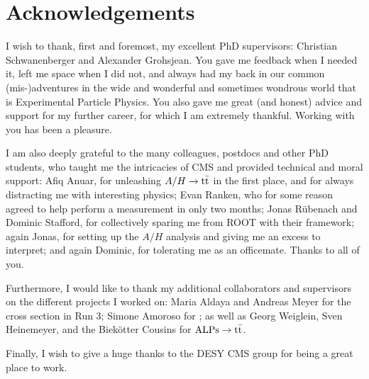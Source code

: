 \chapter{Acknowledgements}

I wish to thank, first and foremost, my excellent PhD supervisors: Christian Schwanenberger and Alexander Grohsjean. You gave me feedback when I needed it, left me space when I did not, and always had my back in our common (mis-)adventures in the wide and wonderful and sometimes wondrous world that is Experimental Particle Physics. You also gave me great (and honest) advice and support for my further career, for which I am extremely thankful. Working with you has been a pleasure.

I am also deeply grateful to the many colleagues, postdocs and other PhD students, who taught me the intricacies of CMS and provided technical and moral support: Afiq Anuar, for unleashing $A/H \rightarrow \mathrm{t \bar{t}}$ in the first place, and for always distracting me with interesting physics; Evan Ranken, who for some reason agreed to help perform a measurement in only two months; Jonas R{\"u}benach and Dominic Stafford, for collectively sparing me from ROOT with their framework; again Jonas, for setting up the $A/H$ analysis and giving me an excess to interpret; and again Dominic, for tolerating me as an officemate. Thanks to all of you.

Furthermore, I would like to thank my additional collaborators and supervisors on the different projects I worked on: Maria Aldaya and Andreas Meyer for the \ttbar cross section in Run 3; Simone Amoroso for \bbfourl; as well as Georg Weiglein, Sven Heinemeyer, and the Biek{\"o}tter Cousins for $\mathrm{ALPs} \rightarrow \mathrm{t \bar{t}}$. 

Finally, I wish to give a huge thanks to the DESY CMS group for being a great place to work.